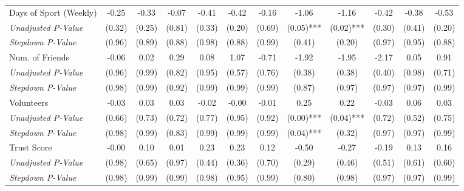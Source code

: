 \begin{tabular}{l c c c c c c c c c c c}
Days of Sport (Weekly) & -0.25 & -0.33 & -0.07 & -0.41 & -0.42 & -0.16 & -1.06 & -1.16 & -0.42 & -0.38 & -0.53 \\
\quad \textit{Unadjusted P-Value} & (0.32) & (0.25) & (0.81) & (0.33) & (0.20) & (0.69) & (0.05)*** & (0.02)*** & (0.30) & (0.41) & (0.20) \\
\quad \textit{Stepdown P-Value} & (0.96) & (0.89) & (0.88) & (0.98) & (0.88) & (0.99) & (0.41) & (0.20) & (0.97) & (0.95) & (0.88) \\
Num. of Friends & -0.06 & 0.02 & 0.29 & 0.08 & 1.07 & -0.71 & -1.92 & -1.95 & -2.17 & 0.05 & 0.91 \\
\quad \textit{Unadjusted P-Value} & (0.96) & (0.99) & (0.82) & (0.95) & (0.57) & (0.76) & (0.38) & (0.38) & (0.40) & (0.98) & (0.71) \\
\quad \textit{Stepdown P-Value} & (0.98) & (0.99) & (0.92) & (0.99) & (0.99) & (0.99) & (0.87) & (0.97) & (0.97) & (0.97) & (0.99) \\
Volunteers & -0.03 & 0.03 & 0.03 & -0.02 & -0.00 & -0.01 & 0.25 & 0.22 & -0.03 & 0.06 & 0.03 \\
\quad \textit{Unadjusted P-Value} & (0.66) & (0.73) & (0.72) & (0.77) & (0.95) & (0.92) & (0.00)*** & (0.04)*** & (0.72) & (0.52) & (0.75) \\
\quad \textit{Stepdown P-Value} & (0.98) & (0.99) & (0.83) & (0.99) & (0.99) & (0.99) & (0.04)*** & (0.32) & (0.97) & (0.97) & (0.99) \\
Trust Score & -0.00 & 0.10 & 0.01 & 0.23 & 0.23 & 0.12 & -0.50 & -0.27 & -0.19 & 0.13 & 0.16 \\
\quad \textit{Unadjusted P-Value} & (0.98) & (0.65) & (0.97) & (0.44) & (0.36) & (0.70) & (0.29) & (0.46) & (0.51) & (0.61) & (0.60) \\
\quad \textit{Stepdown P-Value} & (0.98) & (0.99) & (0.99) & (0.98) & (0.95) & (0.99) & (0.80) & (0.98) & (0.97) & (0.97) & (0.99) \\
\bottomrule
\end{tabular}
